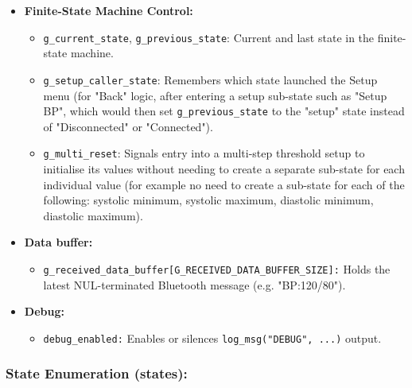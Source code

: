 \begin{itemize}
	\item \textbf{Finite-State Machine Control:}
	\begin{itemize}
		\item \lstinline|g_current_state|, \lstinline|g_previous_state|: Current and last state in the finite-state machine.
		\item \lstinline|g_setup_caller_state|: Remembers which state launched the Setup menu (for "Back" logic, after entering a setup sub-state such as "Setup BP", which would then set \lstinline|g_previous_state| to the "setup" state instead of "Disconnected" or "Connected").
		\item \lstinline|g_multi_reset|: Signals entry into a multi-step threshold setup to initialise its values without needing to create a separate sub-state for each individual value (for example no need to create a sub-state for each of the following: systolic minimum, systolic maximum, diastolic minimum, diastolic maximum).
	\end{itemize}

	\item \textbf{Data buffer:}
	\begin{itemize}
		\item \lstinline|g_received_data_buffer[G_RECEIVED_DATA_BUFFER_SIZE]:| Holds the latest NUL-terminated Bluetooth message (e.g. "BP:120/80").
	\end{itemize}
	
	\item \textbf{Debug:}
	\begin{itemize}
		\item \lstinline|debug_enabled:| Enables or silences \lstinline|log_msg("DEBUG", ...)| output.
	\end{itemize}
\end{itemize}

\subsubsection{State Enumeration (states):}
